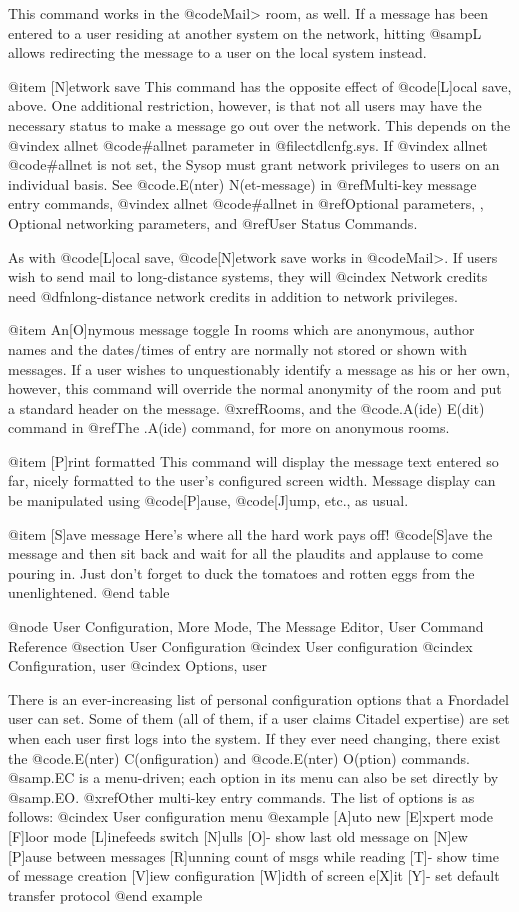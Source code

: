 This command works in the @code{Mail>} room, as well.  If
a message has been entered to a user residing at another
system on the network, hitting @samp{L} allows redirecting the
message to a user on the local system instead.

@item [N]etwork save
This command has the opposite effect of @code{[L]ocal save},
above.  One additional restriction, however, is that not all
users may have the necessary status to make a message go
out over the network.  This depends on the
@vindex allnet
@code{#allnet} parameter
in @file{ctdlcnfg.sys}.  If
@vindex allnet
@code{#allnet} is not set, the Sysop must grant
network privileges to users on an individual basis.
See @code{.E(nter) N(et-message)} in
@ref{Multi-key message entry commands},
@vindex allnet
@code{#allnet} in @ref{Optional parameters, , Optional networking parameters},
and @ref{User Status Commands}.

As with @code{[L]ocal save}, @code{[N]etwork save} works in @code{Mail>}.
If users wish to send mail to long-distance systems, they will
@cindex Network credits
need @dfn{long-distance network credits} in addition to network privileges.

@item An[O]nymous message toggle
In rooms which are anonymous, author names and the dates/times of entry are
normally not stored or shown with messages.  If a user wishes to
unquestionably identify a message as his or her own, however, this command
will override the normal anonymity of the room and put a standard header on
the message.  @xref{Rooms}, and the @code{.A(ide) E(dit)} command in
@ref{The .A(ide) command}, for more on anonymous rooms.

@item [P]rint formatted
This command will display the message text entered
so far, nicely formatted to the user's configured screen
width.  Message display can be manipulated using @code{[P]ause},
@code{[J]ump}, etc., as usual.

@item [S]ave message
Here's where all the hard work pays off!  @code{[S]ave} the
message and then sit back and wait for all the plaudits and
applause to come pouring in.  Just don't forget to duck the
tomatoes and rotten eggs from the unenlightened.
@end table

@node User Configuration, More Mode, The Message Editor, User Command Reference
@section User Configuration
@cindex User configuration
@cindex Configuration, user
@cindex Options, user

There is an ever-increasing list of personal configuration options that
a Fnordadel user can set.  Some of them (all of them, if a user claims
Citadel expertise) are set when each user first logs into the system.  If
they ever need changing, there exist the @code{.E(nter) C(onfiguration)}
and @code{.E(nter) O(ption)} commands.  @samp{.EC} is a menu-driven; each
option in its menu can also be set directly by @samp{.EO}.
@xref{Other multi-key entry commands}.
The list of options is as follows:
@cindex User configuration menu
@example
[A]uto new
[E]xpert mode
[F]loor mode
[L]inefeeds switch
[N]ulls
[O]- show last old message on [N]ew
[P]ause between messages
[R]unning count of msgs while reading
[T]- show time of message creation
[V]iew configuration
[W]idth of screen
e[X]it
[Y]- set default transfer protocol
@end example

